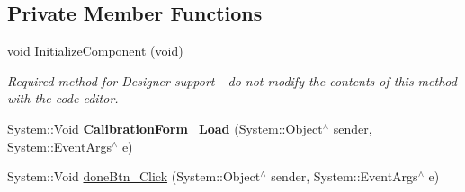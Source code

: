 \subsection*{Private Member Functions}
\begin{DoxyCompactItemize}
\item 
void \mbox{\hyperlink{class_gaze_track_g_u_i_1_1_calibration_form_a414b2f5880e33c407c2d598e7e1d8c23}{Initialize\+Component}} (void)
\begin{DoxyCompactList}\small\item\em Required method for Designer support -\/ do not modify the contents of this method with the code editor. \end{DoxyCompactList}\item 
\mbox{\label{class_gaze_track_g_u_i_1_1_calibration_form_aa7c90a85f572b1f0adfcd6b217f3ce02}} 
System\+::\+Void {\bfseries Calibration\+Form\+\_\+\+Load} (System\+::\+Object$^\wedge$ sender, System\+::\+Event\+Args$^\wedge$ e)
\item 
System\+::\+Void \mbox{\hyperlink{class_gaze_track_g_u_i_1_1_calibration_form_adea20c0c403187714e43d4e45dfa7e6a}{done\+Btn\+\_\+\+Click}} (System\+::\+Object$^\wedge$ sender, System\+::\+Event\+Args$^\wedge$ e)
\end{DoxyCompactItemize}
